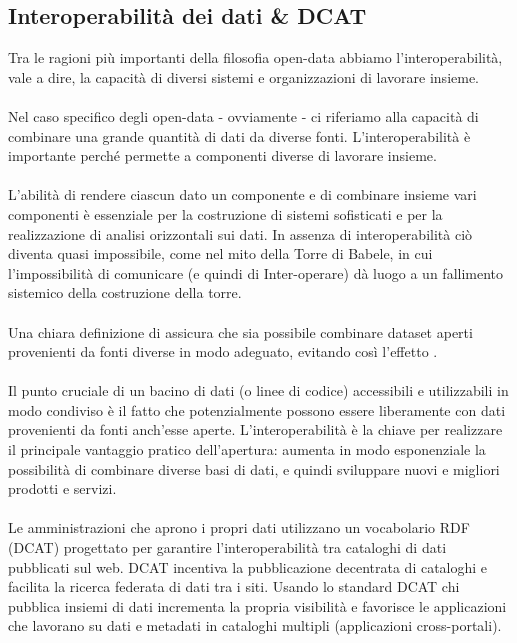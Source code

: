 \documentclass{article}
\theoremstyle{plain}
\theoremstyle{definition}
\begin{document}
\subsection{Interoperabilità dei dati \& DCAT}
Tra le ragioni più importanti della filosofia open-data abbiamo l'interoperabilità, vale a dire, la capacità di diversi sistemi e organizzazioni di lavorare insieme. 
\\
\\
Nel caso specifico degli open-data - ovviamente - ci riferiamo alla capacità di combinare una grande quantità di dati da diverse fonti. L'interoperabilità è importante perché permette a componenti diverse di lavorare insieme.
\\
\\
L'abilità di rendere ciascun dato un componente e di combinare insieme vari componenti è essenziale per la costruzione di sistemi sofisticati e per la realizzazione di analisi orizzontali sui dati. In assenza di interoperabilità ciò diventa quasi impossibile, come nel mito della Torre di Babele, in cui l'impossibilità di comunicare (e quindi di Inter-operare) dà luogo a un fallimento sistemico della costruzione della torre. 
\\
\\
Una chiara definizione di  assicura che sia possibile combinare dataset aperti provenienti da fonti diverse in modo adeguato, evitando così l'effetto .
\\
\\
Il punto cruciale di un bacino di dati (o linee di codice) accessibili e utilizzabili in modo condiviso è il fatto che potenzialmente possono essere liberamente  con dati provenienti da fonti anch'esse aperte. L'interoperabilità è la chiave per realizzare il principale vantaggio pratico dell'apertura: aumenta in modo esponenziale la possibilità di combinare diverse basi di dati, e quindi sviluppare nuovi e migliori prodotti e servizi.
\footnotemark
{}
\\
\\
Le amministrazioni che aprono i propri dati utilizzano un vocabolario RDF (DCAT) progettato per garantire l'interoperabilità tra cataloghi di dati pubblicati sul web. DCAT incentiva la pubblicazione decentrata di cataloghi e facilita la ricerca federata di dati tra i siti. Usando lo standard DCAT chi pubblica insiemi di dati incrementa la propria visibilità e favorisce le applicazioni che lavorano su dati e metadati in cataloghi multipli (applicazioni cross-portali).
\end{document}
